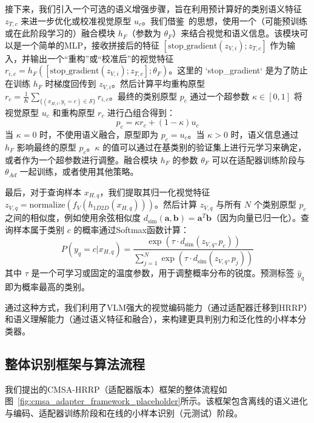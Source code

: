 接下来，我们引入一个可选的语义增强步骤，旨在利用预计算好的类别语义特征 $z_{T,c}$ 来进一步优化或校准视觉原型 $u_c$。我们借鉴~\cite{SemFew}的思想，使用一个（可能预训练或在此阶段学习的）融合模块 $h_F$（参数为 $\theta_F$）来结合视觉和语义信息。该模块可以是一个简单的MLP，接收拼接后的特征 $[\text{stop\_gradient}(z_{V,i}); z_{T,c}]$ 作为输入，并输出一个“重构”或“校准后”的视觉特征 $r_{i,c} = h_F([\text{stop\_gradient}(z_{V,i}); z_{T,c}]; \theta_F)$。这里的 `stop\_gradient` 是为了防止在训练 $h_F$ 时梯度回传到 $z_{V,i}$。然后计算平均重构原型 $r_c = \frac{1}{K} \sum_{\{(x_{H,i}, y_i=c) \in \mathcal{S}\}} r_{i,c}$。最终的类别原型 $p_c$ 通过一个超参数 $\kappa \in [0, 1]$ 将视觉原型 $u_c$ 和重构原型 $r_c$ 进行凸组合得到：
\begin{equation}
    p_c = \kappa r_c + (1 - \kappa) u_c
    \label{eq:semantic_fusion_prototype}
\end{equation}
当 $\kappa=0$ 时，不使用语义融合，原型即为 $p_c = u_c$。当 $\kappa>0$ 时，语义信息通过 $h_F$ 影响最终的原型 $p_c$。$\kappa$ 的值可以通过在基类别的验证集上进行元学习来确定，或者作为一个超参数进行调整。融合模块 $h_F$ 的参数 $\theta_F$ 可以在适配器训练阶段与 $\theta_{Ad}$ 一起训练，或者使用其他策略。

最后，对于查询样本 $x_{H,q}$，我们提取其归一化视觉特征 $z_{V,q} = \text{normalize}(f_V(h_{1D2D}(x_{H,q})))$。然后计算 $z_{V,q}$ 与所有 $N$ 个类别原型 $p_c$ 之间的相似度，例如使用余弦相似度 $d_{\text{sim}}(\mathbf{a}, \mathbf{b}) = \mathbf{a}^T \mathbf{b}$（因为向量已归一化）。查询样本属于类别 $c$ 的概率通过Softmax函数计算：
\begin{equation}
    P(y_q = c | x_{H,q}) = \frac{\exp(\tau \cdot d_{\text{sim}}(z_{V,q}, p_c))}{\sum_{j=1}^{N} \exp(\tau \cdot d_{\text{sim}}(z_{V,q}, p_j))}
    \label{eq:classification_semantic}
\end{equation}
其中 $\tau$ 是一个可学习或固定的温度参数，用于调整概率分布的锐度。预测标签 $\hat{y}_q$ 即为概率最高的类别。

通过这种方式，我们利用了VLM强大的视觉编码能力（通过适配器迁移到HRRP）和语义理解能力（通过语义特征和融合），来构建更具判别力和泛化性的小样本分类器。

\subsection{整体识别框架与算法流程}
\label{subsec:overall_framework_semantic}

我们提出的CMSA-HRRP（适配器版本）框架的整体流程如图~\ref{fig:cmsa_adapter_framework_placeholder}所示。该框架包含离线的语义进化与编码、适配器训练阶段和在线的小样本识别（元测试）阶段。

